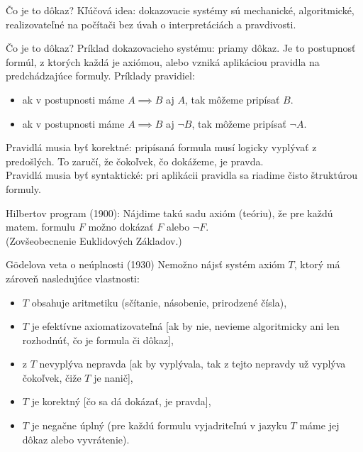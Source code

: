 \documentclass[12pt]{beamer}
\theoremstyle{definition}
\begin{document}
\begin{frame}{Čo je to dôkaz?}
Kľúčová idea: dokazovacie systémy sú mechanické, algoritmické,
realizovateľné na počítači bez úvah o interpretáciách a pravdivosti.
\end{frame}

\begin{frame}{Čo je to dôkaz?}
Príklad dokazovacieho systému: \alert{priamy dôkaz}. Je to postupnosť formúl, z ktorých každá je axiómou, alebo vzniká aplikáciou pravidla na predchádzajúce formuly.
Príklady pravidiel:
\begin{itemize}
\item ak v postupnosti máme $A\implies B$ aj $A$, tak môžeme pripísať $B$.
\item ak v postupnosti máme $A\implies B$ aj $\lnot B$, tak môžeme pripísať $\lnot A$.
\end{itemize}

Pravidlá musia byť \alert{korektné}: pripísaná formula musí logicky vyplývať z predošlých. To zaručí, že čokoľvek, čo dokážeme, je pravda.\\[3mm]

Pravidlá musia byť \alert{syntaktické}: pri aplikácii pravidla sa riadime čisto štruktúrou formuly.
\end{frame}

\begin{frame}
Hilbertov program (1900):
Nájdime takú sadu axióm (teóriu), že pre každú matem. formulu $F$ možno dokázať $F$ alebo $\lnot F$.\\[5mm]
(Zovšeobecnenie Euklidových Základov.)
\end{frame}

\begin{frame}{G\"odelova veta o neúplnosti (1930)}
Nemožno nájsť systém axióm $T$, ktorý má zároveň nasledujúce vlastnosti:
\begin{itemize}
\item $T$ obsahuje aritmetiku (sčítanie, násobenie, prirodzené čísla),
\item $T$ je efektívne axiomatizovateľná [ak by nie, nevieme algoritmicky ani len rozhodnúť, čo je formula či dôkaz],
\item z $T$ nevyplýva nepravda [ak by vyplývala, tak z tejto nepravdy už vyplýva čokoľvek, čiže $T$ je nanič],
\item $T$ je korektný [čo sa dá dokázať, je pravda],
\item $T$ je negačne úplný (pre každú formulu vyjadriteľnú v jazyku $T$ máme jej dôkaz alebo vyvrátenie).
\end{itemize}
\end{frame}
\end{document}
